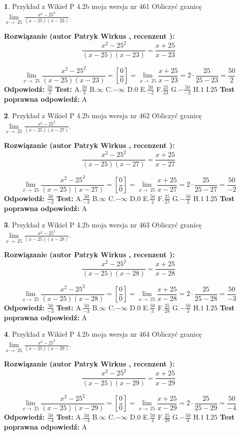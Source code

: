 \documentclass[12pt, a4paper]{article}
\theoremstyle{definition} %
\newtheorem{zad}{}
\newcommand{\zadStart}[1]{\begin{zad}#1\newline}
\newcommand{\zadStop}{\end{zad}}
\newcommand{\rozwStart}[2]{\noindent \textbf{Rozwiązanie (autor #1 , recenzent #2): }\newline}
\newcommand{\rozwStop}{\newline}
\newcommand{\odpStart}{\noindent \textbf{Odpowiedź:}\newline}
\newcommand{\odpStop}{\newline}
\newcommand{\testStart}{\noindent \textbf{Test:}\newline}
\newcommand{\testStop}{\newline}
\newcommand{\kluczStart}{\noindent \textbf{Test poprawna odpowiedź:}\newline}
\newcommand{\kluczStop}{\newline}
\begin{document}
\zadStart{Przykład z Wikieł P 4.2b moja wersja nr 461}
Obliczyć granicę $\lim\limits_{x\to\ 25}\frac{x^{2}-25^{2}}{(x-25)(x-23)}$.
\zadStop
\rozwStart{Patryk Wirkus}{}
$$\frac{x^{2}-25^{2}}{(x-25)(x-23)}=\frac{x+25}{x-23}$$

$$\lim\limits_{x\to\ 25}\frac{x^{2}-25^{2}}{(x-25)(x-23)}=[\frac{0}{0}]=\lim\limits_{x\to\ 25}\frac{x+25}{x-23}=2 \cdot \frac{25}{25-23} = \frac{50}{2}$$
\rozwStop
\odpStart
$\frac{50}{2}$
\odpStop
\testStart
A.$\frac{50}{2}$
B.$\infty$
C.$-\infty$
D.$0$
E.$\frac{50}{-2}$
F.$\frac{25}{23}$
G.$-\frac{50}{-2}$
H.$1$
I.$25$
\testStop
\kluczStart
A
\kluczStop



\zadStart{Przykład z Wikieł P 4.2b moja wersja nr 462}
Obliczyć granicę $\lim\limits_{x\to\ 25}\frac{x^{2}-25^{2}}{(x-25)(x-27)}$.
\zadStop
\rozwStart{Patryk Wirkus}{}
$$\frac{x^{2}-25^{2}}{(x-25)(x-27)}=\frac{x+25}{x-27}$$

$$\lim\limits_{x\to\ 25}\frac{x^{2}-25^{2}}{(x-25)(x-27)}=[\frac{0}{0}]=\lim\limits_{x\to\ 25}\frac{x+25}{x-27}=2 \cdot \frac{25}{25-27} = \frac{50}{-2}$$
\rozwStop
\odpStart
$\frac{50}{-2}$
\odpStop
\testStart
A.$\frac{50}{-2}$
B.$\infty$
C.$-\infty$
D.$0$
E.$\frac{50}{2}$
F.$\frac{25}{27}$
G.$-\frac{50}{2}$
H.$1$
I.$25$
\testStop
\kluczStart
A
\kluczStop



\zadStart{Przykład z Wikieł P 4.2b moja wersja nr 463}
Obliczyć granicę $\lim\limits_{x\to\ 25}\frac{x^{2}-25^{2}}{(x-25)(x-28)}$.
\zadStop
\rozwStart{Patryk Wirkus}{}
$$\frac{x^{2}-25^{2}}{(x-25)(x-28)}=\frac{x+25}{x-28}$$

$$\lim\limits_{x\to\ 25}\frac{x^{2}-25^{2}}{(x-25)(x-28)}=[\frac{0}{0}]=\lim\limits_{x\to\ 25}\frac{x+25}{x-28}=2 \cdot \frac{25}{25-28} = \frac{50}{-3}$$
\rozwStop
\odpStart
$\frac{50}{-3}$
\odpStop
\testStart
A.$\frac{50}{-3}$
B.$\infty$
C.$-\infty$
D.$0$
E.$\frac{50}{3}$
F.$\frac{25}{28}$
G.$-\frac{50}{3}$
H.$1$
I.$25$
\testStop
\kluczStart
A
\kluczStop



\zadStart{Przykład z Wikieł P 4.2b moja wersja nr 464}
Obliczyć granicę $\lim\limits_{x\to\ 25}\frac{x^{2}-25^{2}}{(x-25)(x-29)}$.
\zadStop
\rozwStart{Patryk Wirkus}{}
$$\frac{x^{2}-25^{2}}{(x-25)(x-29)}=\frac{x+25}{x-29}$$

$$\lim\limits_{x\to\ 25}\frac{x^{2}-25^{2}}{(x-25)(x-29)}=[\frac{0}{0}]=\lim\limits_{x\to\ 25}\frac{x+25}{x-29}=2 \cdot \frac{25}{25-29} = \frac{50}{-4}$$
\rozwStop
\odpStart
$\frac{50}{-4}$
\odpStop
\testStart
A.$\frac{50}{-4}$
B.$\infty$
C.$-\infty$
D.$0$
E.$\frac{50}{4}$
F.$\frac{25}{29}$
G.$-\frac{50}{4}$
H.$1$
I.$25$
\testStop
\kluczStart
A
\kluczStop
\end{document}
